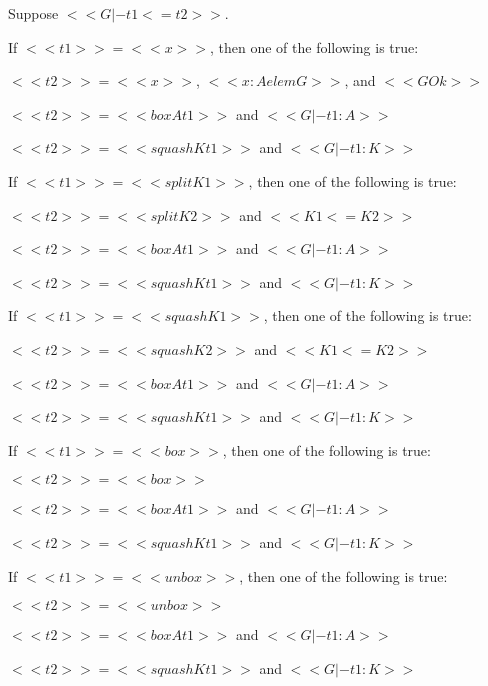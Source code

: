 \begin{lemma}
  \label{lemma:inversion_for_term_precision_for_core_grady}
  Suppose $<<G |- t1 <= t2>>$.
  \begin{enumR}
  \item[]
  \item If $<<t1>> = <<x>>$, then one of the following is true:
    \begin{enumA}
    \item $<<t2>> = <<x>>$, $<<x : A elem G>>$, and $<<G Ok>>$
    \item $<<t2>> = <<box A t1>>$ and $<<G |- t1 : A>>$
    \item $<<t2>> = <<squash K t1>>$ and $<<G |- t1 : K>>$
    \end{enumA}

  \item If $<<t1>> = <<split K1>>$, then one of the following is true:
    \begin{enumA}
    \item $<<t2>> = <<split K2>>$ and $<<K1 <= K2>>$
    \item $<<t2>> = <<box A t1>>$ and $<<G |- t1 : A>>$
    \item $<<t2>> = <<squash K t1>>$ and $<<G |- t1 : K>>$
    \end{enumA}

  \item If $<<t1>> = <<squash K1>>$, then one of the following is true:
    \begin{enumA}
    \item $<<t2>> = <<squash K2>>$ and $<<K1 <= K2>>$
    \item $<<t2>> = <<box A t1>>$ and $<<G |- t1 : A>>$
    \item $<<t2>> = <<squash K t1>>$ and $<<G |- t1 : K>>$
    \end{enumA}

  \item If $<<t1>> = <<box>>$, then one of the following is true:
    \begin{enumA}
    \item $<<t2>> = <<box>>$
    \item $<<t2>> = <<box A t1>>$ and $<<G |- t1 : A>>$
    \item $<<t2>> = <<squash K t1>>$ and $<<G |- t1 : K>>$
    \end{enumA}

  \item If $<<t1>> = <<unbox>>$, then one of the following is true:
    \begin{enumA}
    \item $<<t2>> = <<unbox>>$
    \item $<<t2>> = <<box A t1>>$ and $<<G |- t1 : A>>$
    \item $<<t2>> = <<squash K t1>>$ and $<<G |- t1 : K>>$
    \end{enumA}


\end{enumR}
\end{lemma}
